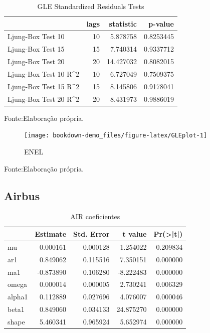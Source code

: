\documentclass[
  12pt,
  a4paper,
  openany]{book}
\begin{document}
\begin{table}[!h]

\caption{\label{tab:unnamed-chunk-38}GLE Standardized Residuals Tests}
\centering
\begin{tabular}[t]{lrrr}
\toprule
  & lags & statistic & p-value\\
\midrule
Ljung-Box Test 10 & 10 & 5.878758 & 0.8253445\\
Ljung-Box Test 15 & 15 & 7.740314 & 0.9337712\\
Ljung-Box Test 20 & 20 & 14.427032 & 0.8082015\\
Ljung-Box Test 10 R\textasciicircum{}2 & 10 & 6.727049 & 0.7509375\\
Ljung-Box Test 15 R\textasciicircum{}2 & 15 & 8.145806 & 0.9178041\\
\addlinespace
Ljung-Box Test 20 R\textasciicircum{}2 & 20 & 8.431973 & 0.9886019\\
\bottomrule
\end{tabular}
\end{table}
\FloatBarrier
\centering

Fonte:Elaboração própria.

\justifying
\bigskip
\begin{figure}

{\centering \texttt{[image: bookdown-demo\_files/figure-latex/GLEplot-1]} 

}

\caption{ENEL}\label{fig:GLEplot}
\end{figure}
\FloatBarrier
\centering

Fonte:Elaboração própria.

\justifying
\bigskip

\hypertarget{airbus}{%
\subsection{Airbus}\label{airbus}}

\begin{table}[!h]

\caption{\label{tab:unnamed-chunk-40}AIR coeficientes}
\centering
\begin{tabular}[t]{lrrrr}
\toprule
  &  Estimate &  Std. Error &  t value & Pr(>|t|)\\
\midrule
mu & 0.000161 & 0.000128 & 1.254022 & 0.209834\\
ar1 & 0.849062 & 0.115516 & 7.350151 & 0.000000\\
ma1 & -0.873890 & 0.106280 & -8.222483 & 0.000000\\
omega & 0.000014 & 0.000005 & 2.730241 & 0.006329\\
alpha1 & 0.112889 & 0.027696 & 4.076007 & 0.000046\\
\addlinespace
beta1 & 0.849060 & 0.034133 & 24.875270 & 0.000000\\
shape & 5.460341 & 0.965924 & 5.652974 & 0.000000\\
\bottomrule
\end{tabular}
\end{table}
\FloatBarrier
\centering
\end{document}
